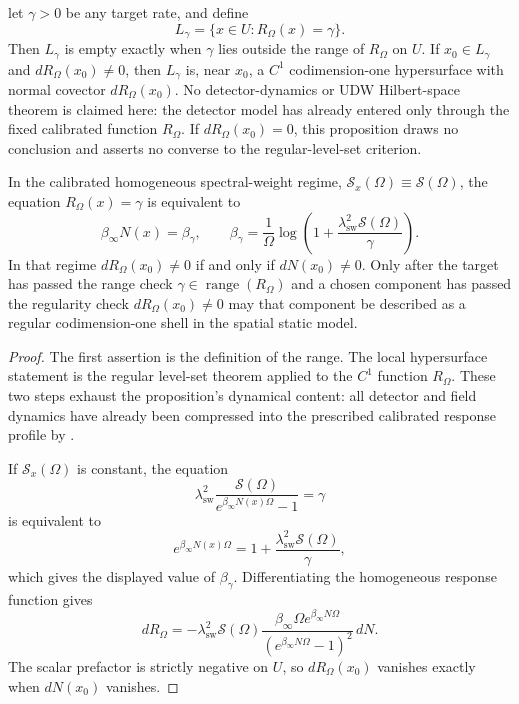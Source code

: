 \begin{proposition}\label{thm:response-locus-main}
\ResponseStandingClause let $\gamma>0$ be any target
rate, and define
\[
L_\gamma=\{x\in U:R_\Omega(x)=\gamma\}.
\]
Then $L_\gamma$ is empty exactly when $\gamma$ lies outside the range of
$R_\Omega$ on $U$. If $x_0\in L_\gamma$ and $dR_\Omega(x_0)\neq 0$, then
$L_\gamma$ is, near $x_0$, a $C^1$ codimension-one hypersurface with normal
covector $dR_\Omega(x_0)$.
No detector-dynamics or UDW Hilbert-space theorem is claimed here: the detector
model has already entered only through the fixed calibrated function
$R_\Omega$. If $dR_\Omega(x_0)=0$, this proposition draws no conclusion and asserts
no converse to the regular-level-set criterion.

In the calibrated homogeneous spectral-weight regime,
$\mathcal S_x(\Omega)\equiv\mathcal S(\Omega)$, the equation $R_\Omega(x)=\gamma$
is equivalent to
\[
\beta_\infty N(x)=\beta_\gamma,
\qquad
\beta_\gamma=\frac{1}{\Omega}
\log\!\left(1+\frac{\lambda_{\mathrm{sw}}^2\mathcal S(\Omega)}{\gamma}\right).
\]
In that regime $dR_\Omega(x_0)\neq 0$ if and only if $dN(x_0)\neq0$. Only after
the target has passed the range check
$\gamma\in\operatorname{range}(R_\Omega)$ and a chosen component has passed the
regularity check $dR_\Omega(x_0)\neq 0$ may that component be described as a
regular codimension-one shell in the spatial static model.
\end{proposition}

\begin{proof}
The first assertion is the definition of the range. The local hypersurface
statement is the regular level-set theorem applied to the $C^1$ function
$R_\Omega$. These two steps exhaust the proposition's dynamical content: all
detector and field dynamics have already been compressed into the prescribed
calibrated response profile by .

If $\mathcal S_x(\Omega)$ is constant, the equation
\[
\lambda_{\mathrm{sw}}^2\frac{\mathcal S(\Omega)}{e^{\beta_\infty N(x)\Omega}-1}=\gamma
\]
is equivalent to
\[
e^{\beta_\infty N(x)\Omega}
=1+\frac{\lambda_{\mathrm{sw}}^2\mathcal S(\Omega)}{\gamma},
\]
which gives the displayed value of $\beta_\gamma$. Differentiating the
homogeneous response function gives
\[
dR_\Omega
=
-\lambda_{\mathrm{sw}}^2\mathcal S(\Omega)
\frac{\beta_\infty\Omega e^{\beta_\infty N\Omega}}
{(e^{\beta_\infty N\Omega}-1)^2}\,dN .
\]
The scalar prefactor is strictly negative on $U$, so $dR_\Omega(x_0)$
vanishes exactly when $dN(x_0)$ vanishes.
\end{proof}

